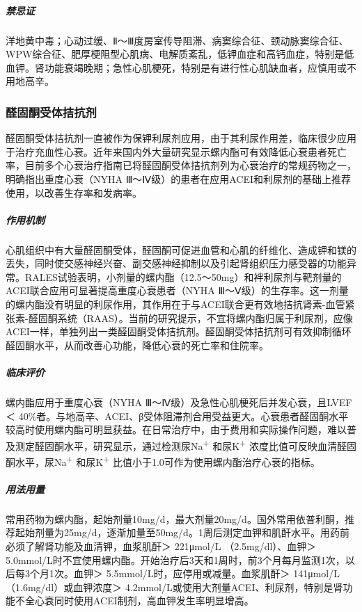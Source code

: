 \subparagraph{禁忌证}

洋地黄中毒；心动过缓、Ⅱ～Ⅲ度房室传导阻滞、病窦综合征、颈动脉窦综合征、WPW综合征、肥厚梗阻型心肌病、电解质紊乱，低钾血症和高钙血症，特别是低血钾。肾功能衰竭晚期；急性心肌梗死，特别是有进行性心肌缺血者，应慎用或不用地高辛。

\subsubsection{醛固酮受体拮抗剂}

醛固酮受体拮抗剂一直被作为保钾利尿剂应用，由于其利尿作用差，临床很少应用于治疗充血性心衰。近年来国内外大量研究显示螺内酯可有效降低心衰患者死亡率，目前多个心衰治疗指南已将醛固酮受体拮抗剂列为心衰治疗的常规药物之一，明确指出重度心衰（NYHA
Ⅲ～Ⅳ级）的患者在应用ACEI和利尿剂的基础上推荐使用，以改善生存率和发病率。

\subparagraph{作用机制}

心肌组织中有大量醛固酮受体，醛固酮可促进血管和心肌的纤维化、造成钾和镁的丢失，同时使交感神经兴奋、副交感神经抑制以及引起肾组织压力感受器的功能异常。RALES试验表明，小剂量的螺内酯（12.5～50mg）和袢利尿剂与靶剂量的ACEI联合应用可显著提高重度心衰患者（NYHA
Ⅲ～Ⅴ级）的生存率。这一剂量的螺内酯没有明显的利尿作用，其作用在于与ACEI联合更有效地拮抗肾素-血管紧张素-醛固酮系统（RAAS）。当前的研究提示，不宜将螺内酯归属于利尿剂，应像ACEI一样，单独列出一类醛固酮受体拮抗剂。醛固酮受体拮抗剂可有效抑制循环醛固酮水平，从而改善心功能，降低心衰的死亡率和住院率。

\subparagraph{临床评价}

螺内酯应用于重度心衰（NYHA Ⅲ～Ⅳ级）及急性心肌梗死后并发心衰，且LVEF ＜
40\%者。与地高辛、ACEI、β受体阻滞剂合用受益更大。心衰患者醛固酮水平较高时使用螺内酯可明显获益。在日常治疗中，由于费用和实际操作问题，难以普及测定醛固酮水平，研究显示，通过检测尿Na\textsuperscript{+}
和尿K\textsuperscript{+}
浓度比值可反映血清醛固酮水平，尿Na\textsuperscript{+}
和尿K\textsuperscript{+} 比值小于1.0可作为使用螺内酯治疗心衰的指标。

\subparagraph{用法用量}

常用药物为螺内酯，起始剂量10mg/d，最大剂量20mg/d。国外常用依普利酮，推荐起始剂量为25mg/d，逐渐加量至50mg/d。1周后测定血钾和肌酐水平。用药前必须了解肾功能及血清钾，血浆肌酐＞
221μmol/L （2.5mg/dl）、血钾＞
5.0mmol/L时不宜使用螺内酯。开始治疗后3天和1周时，前3个月每月监测1次，以后每3个月1次。血钾＞
5.5mmol/L时，应停用或减量。血浆肌酐＞ 141μmol/L（1.6mg/dl）或血钾浓度＞
4.2mmol/L或使用大剂量ACEI、利尿剂，特别是肾功能不全心衰同时使用ACEI制剂，高血钾发生率明显增高。

